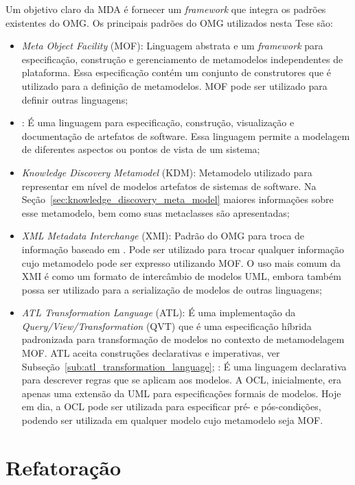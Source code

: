 Um objetivo claro da MDA é fornecer um \textit{framework} que integra os padrões existentes do OMG. Os principais padrões do OMG utilizados nesta Tese são:

\begin{itemize}
\item \textit{Meta Object Facility} (MOF): Linguagem abstrata e um \textit{framework} para especificação, construção e gerenciamento de metamodelos independentes de plataforma. Essa especificação contém um conjunto de construtores que é utilizado para a definição de metamodelos. MOF pode ser utilizado para definir outras linguagens;
\item {}: É uma linguagem para especificação, construção, visualização e documentação de artefatos de software. Essa linguagem permite a modelagem de diferentes aspectos ou pontos de vista de um sistema;
\item \textit{Knowledge Discovery Metamodel} (KDM): Metamodelo utilizado para representar em nível de modelos artefatos de sistemas de software. Na Seção~\ref{sec:knowledge_discovery_meta_model} maiores informações sobre esse metamodelo, bem como suas metaclasses são apresentadas;
\item \textit{XML Metadata Interchange} (XMI): Padrão do OMG para troca de informação baseado em . Pode ser utilizado para trocar qualquer informação cujo metamodelo pode ser expresso utilizando MOF. O uso mais comum da XMI é como um formato de intercâmbio de modelos UML, embora também possa ser utilizado para a serialização de modelos de outras linguagens;
\item \textit{ATL Transformation Language} (ATL): É uma implementação da \textit{Query/View/Transformation} (QVT) que é uma especificação híbrida padronizada para transformação de modelos no contexto de metamodelagem MOF. ATL aceita construções declarativas e imperativas, ver Subseção~\ref{sub:atl_transformation_language};
: É uma linguagem declarativa para descrever regras que se aplicam aos modelos. A OCL, inicialmente, era apenas uma extensão da UML para especificações formais de modelos. Hoje em dia, a OCL pode ser utilizada para especificar pré- e pós-condições, podendo ser utilizada em qualquer modelo cujo metamodelo seja MOF.
\end{itemize}

\section{Refatoração}\label{sec:refatoracao}

